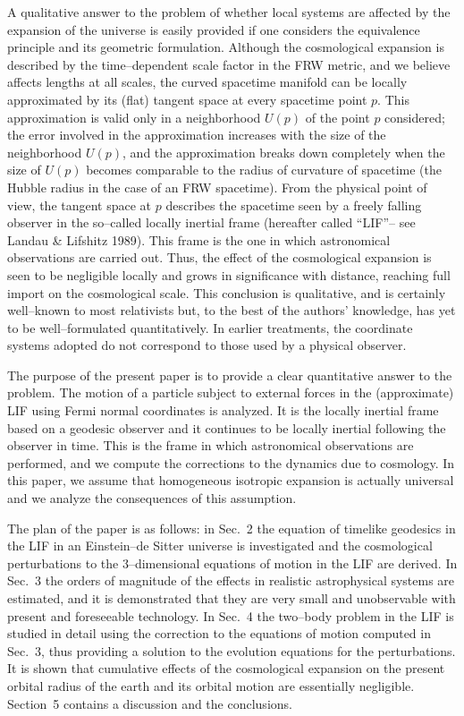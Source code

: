   
  A qualitative answer to the problem of whether local systems are
affected by the
  expansion of the universe is easily provided if one considers the
  equivalence principle and its geometric formulation. 
  Although the cosmological expansion is described by the time--dependent scale
  factor in the FRW metric, and we believe affects lengths at all scales, 
  the
  curved spacetime manifold can be locally approximated by its (flat) tangent
  space at every spacetime point $p$. This approximation is valid only in a 
  neighborhood $U(p)$ of the point $p$ considered; the error involved in the
  approximation increases with the size of the neighborhood $U(p)$, and the
  approximation breaks down completely when the size of $U(p)$ becomes 
  comparable to the radius of curvature  of spacetime (the Hubble radius 
  in the case of an 
  FRW spacetime). From the physical point of view, the
  tangent space at $p$ describes the spacetime seen by a freely falling
observer
  in the so--called locally inertial frame (hereafter called ``LIF''-- see
Landau
  \& Lifshitz 1989). This frame is the one in which astronomical
  observations are carried out. Thus, the effect of the cosmological
expansion is
  seen to be negligible locally and grows in significance with distance,
reaching
  full import on the cosmological scale. This conclusion is qualitative,
  and is certainly well--known to most relativists but, to the best of the
  authors' knowledge, has yet to be well--formulated quantitatively. In
earlier
  treatments, the coordinate systems adopted do not correspond to those
used by a
  physical observer. 
  
  The purpose of the present paper is to provide a
  clear quantitative answer to the problem. The motion of a particle
  subject to external forces in the (approximate) LIF using Fermi normal
  coordinates is analyzed. It is the locally inertial frame based on a
geodesic observer and it continues to be locally inertial following the
observer in time. 
This is
  the frame in which
  astronomical observations are performed, and we compute the corrections
to the
  dynamics due to cosmology. In this paper, we assume that homogeneous
isotropic expansion is actually universal and we analyze the consequences
of this assumption. 
  
  The plan of the paper is as follows: in Sec.~2 the equation of
  timelike geodesics in the LIF in an Einstein--de Sitter universe is
investigated
  and the cosmological perturbations to the 3--dimensional equations of
motion
  in the LIF are derived. In Sec.~3
  the orders of magnitude of the effects in realistic astrophysical
  systems are estimated, and it is demonstrated that they are very small and 
  unobservable with present and foreseeable technology. In Sec.~4 the two--body 
  problem in the LIF is studied in detail using the correction to the equations
  of motion computed in Sec.~3, thus providing a solution to the evolution
  equations for the perturbations. It is shown that cumulative effects of the
  cosmological expansion on the present orbital radius of the earth and its
  orbital motion are essentially negligible. Section~5 contains 
  a discussion and the conclusions.
  

